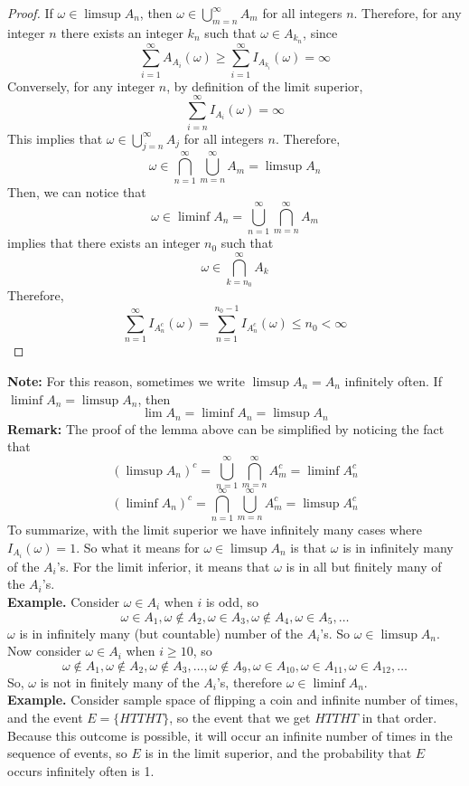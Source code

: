 \begin{proof}
    If $\omega \in \limsup A_n$, then $\omega \in \bigcup\limits_{m=n}^\infty A_m$ for all integers $n$. Therefore, for any integer $n$ there exists an integer $k_n$ such that $\omega \in A_{k_n}$, since 
    \[\sum_{i=1}^\infty A_{A_i} (\omega) \geq \sum_{i=1}^\infty I_{A_{k_i}}(\omega) = \infty\]
    Conversely, for any integer $n$, by definition of the limit superior, 
    \[\sum_{i=n}^\infty I_{A_i}(\omega) = \infty\]
    This implies that $\omega \in \bigcup\limits_{j=n}^\infty A_j$ for all integers $n$. Therefore, 
    \[\omega \in \bigcap_{n=1}^\infty \bigcup_{m=n}^\infty A_m = \limsup A_n\]
    Then, we can notice that 
    \[\omega \in \liminf A_n = \bigcup_{n=1}^\infty \bigcap_{m=n}^\infty A_m \]
    implies that there exists an integer $n_0$ such that 
    \[\omega \in \bigcap_{k=n_0}^\infty A_k\]
    Therefore, 
    \[\sum_{n=1}^\infty I_{A_n^c} (\omega) = \sum_{n=1}^{n_0-1} I_{A_n^c} (\omega) \leq n_0 < \infty\]

\end{proof}
\textbf{Note:} For this reason, sometimes we write $\limsup A_n = A_n$ infinitely often. If $\liminf A_n = \limsup A_n$, then 
\[\lim A_n = \liminf A_n = \limsup A_n\]
\textbf{Remark:} The proof of the lemma above can be simplified by noticing the fact that 
\[(\limsup A_n)^c = \bigcup_{n=1}^\infty \bigcap_{m=n}^\infty A_m^c = \liminf A_n^c\]
\[(\liminf A_n)^c = \bigcap_{n=1}^\infty \bigcup_{m=n}^\infty A_m^c = \limsup A_n^c\]
To summarize, with the limit superior we have infinitely many cases where $I_{A_i}(\omega) = 1$. So what it means for $\omega \in \limsup A_n$ is that $\omega$ is in infinitely many of the $A_i$'s. For the limit inferior, it means that $\omega$ is in all but finitely many of the $A_i$'s.\\[2ex]
\noindent
\textbf{Example.}
Consider $\omega \in A_i$ when $i$ is odd, so 
\[\omega \in A_1, \omega \not\in A_2, \omega \in A_3, \omega \not\in A_4, \omega \in A_5, \ldots\]
$\omega$ is in infinitely many (but countable) number of the $A_i$'s. So $\omega \in \limsup A_n$. Now consider $\omega \in A_i$ when $i \geq 10$, so 
\[\omega \not\in A_1, \omega \not\in A_2, \omega \not\in A_3, \ldots, \omega \not\in A_9, \omega \in A_{10}, \omega \in A_{11}, \omega \in A_{12}, \ldots\]
So, $\omega$ is not in finitely many of the $A_i$'s, therefore $\omega \in \liminf A_n$.\\[2ex]
\noindent
\textbf{Example.} Consider sample space of flipping a coin and infinite number of times, and the event $E = \{HTTHT\}$, so the event that we get $HTTHT$ in that order. Because this outcome is possible, it will occur an infinite number of times in the sequence of events, so $E$ is in the limit superior, and the probability that $E$ occurs infinitely often is 1.

